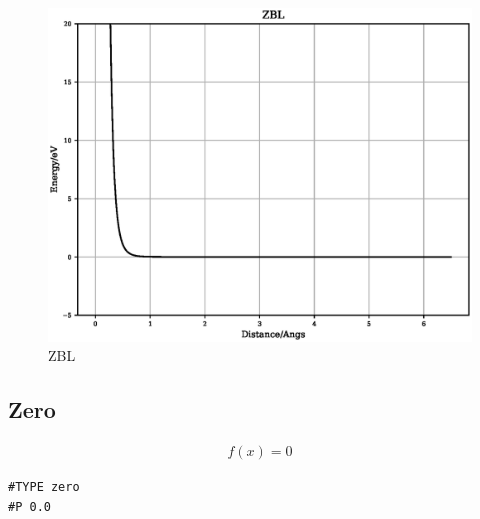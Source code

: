 \documentclass[12pt,twoside]{manual}
\begin{document}
\begin{appendices}
\FloatBarrier
\begin{figure}[h]
  \begin{center}
    \includegraphics[scale=0.5]{img/plots/zbl.eps}
    \caption{ZBL}
    \label{graph:graph1}
  \end{center}
\end{figure}
\FloatBarrier







\subsection{Zero}

\begin{equation}
\begin{split}
f(x) = 0
\end{split}
\label{eq:zero}
\end{equation}

\begin{lstlisting}[style=pseudocode,caption={Zero}]
#TYPE zero
#P 0.0
\end{lstlisting}


\end{appendices}
\end{document}
